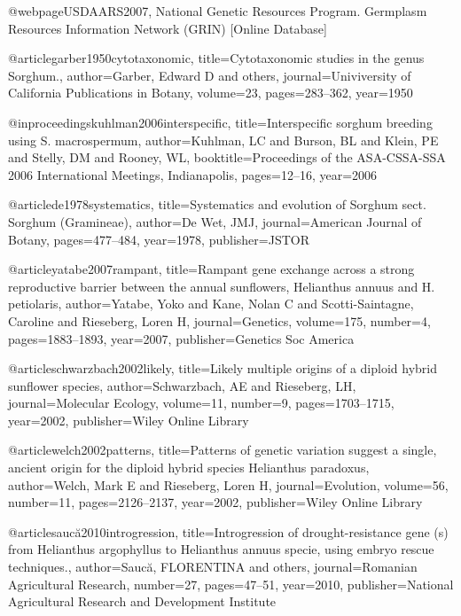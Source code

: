 {@webpage{USDAARS2007,
National Genetic Resources Program. Germplasm Resources Information Network (GRIN) [Online Database]
}

@article{garber1950cytotaxonomic,
  title={Cytotaxonomic studies in the genus Sorghum.},
  author={Garber, Edward D and others},
  journal={Univiversity of California Publications in Botany},
  volume={23},
  pages={283--362},
  year={1950}
}

@inproceedings{kuhlman2006interspecific,
  title={Interspecific sorghum breeding using S. macrospermum},
  author={Kuhlman, LC and Burson, BL and Klein, PE and Stelly, DM and Rooney, WL},
  booktitle={Proceedings of the ASA-CSSA-SSA 2006 International Meetings, Indianapolis},
  pages={12--16},
  year={2006}
}

@article{de1978systematics,
  title={Systematics and evolution of Sorghum sect. Sorghum (Gramineae)},
  author={De Wet, JMJ},
  journal={American Journal of Botany},
  pages={477--484},
  year={1978},
  publisher={JSTOR}
}

@article{yatabe2007rampant,
  title={Rampant gene exchange across a strong reproductive barrier between the annual sunflowers, Helianthus annuus and H. petiolaris},
  author={Yatabe, Yoko and Kane, Nolan C and Scotti-Saintagne, Caroline and Rieseberg, Loren H},
  journal={Genetics},
  volume={175},
  number={4},
  pages={1883--1893},
  year={2007},
  publisher={Genetics Soc America}
}

@article{schwarzbach2002likely,
  title={Likely multiple origins of a diploid hybrid sunflower species},
  author={Schwarzbach, AE and Rieseberg, LH},
  journal={Molecular Ecology},
  volume={11},
  number={9},
  pages={1703--1715},
  year={2002},
  publisher={Wiley Online Library}
}

@article{welch2002patterns,
  title={Patterns of genetic variation suggest a single, ancient origin for the diploid hybrid species Helianthus paradoxus},
  author={Welch, Mark E and Rieseberg, Loren H},
  journal={Evolution},
  volume={56},
  number={11},
  pages={2126--2137},
  year={2002},
  publisher={Wiley Online Library}
}

@article{saucă2010introgression,
  title={Introgression of drought-resistance gene (s) from Helianthus argophyllus to Helianthus annuus specie, using embryo rescue techniques.},
  author={Saucă, FLORENTINA and others},
  journal={Romanian Agricultural Research},
  number={27},
  pages={47--51},
  year={2010},
  publisher={National Agricultural Research and Development Institute}
}

}

